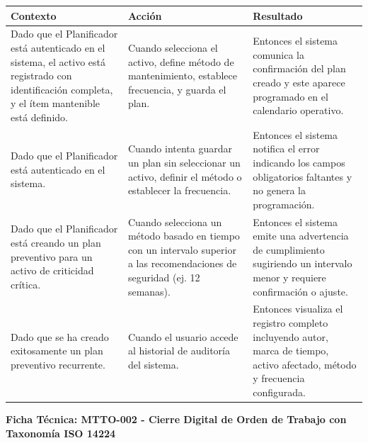 \footnotesize\begin{longtable}{|p{0.28\textwidth}|p{0.32\textwidth}|p{0.34\textwidth}|}\hline
\textbf{Contexto} & \textbf{Acción} & \textbf{Resultado} \\ \hline
\parbox[t]{\linewidth}{Dado que el Planificador está autenticado en el sistema, el activo está registrado con identificación completa, y el ítem mantenible está definido.} & \parbox[t]{\linewidth}{Cuando selecciona el activo, define método de mantenimiento, establece frecuencia, y guarda el plan.} & \parbox[t]{\linewidth}{Entonces el sistema comunica la confirmación del plan creado y este aparece programado en el calendario operativo.} \\ \hline
\parbox[t]{\linewidth}{Dado que el Planificador está autenticado en el sistema.} & \parbox[t]{\linewidth}{Cuando intenta guardar un plan sin seleccionar un activo, definir el método o establecer la frecuencia.} & \parbox[t]{\linewidth}{Entonces el sistema notifica el error indicando los campos obligatorios faltantes y no genera la programación.} \\ \hline
\parbox[t]{\linewidth}{Dado que el Planificador está creando un plan preventivo para un activo de criticidad crítica.} & \parbox[t]{\linewidth}{Cuando selecciona un método basado en tiempo con un intervalo superior a las recomendaciones de seguridad (ej. 12 semanas).} & \parbox[t]{\linewidth}{Entonces el sistema emite una advertencia de cumplimiento sugiriendo un intervalo menor y requiere confirmación o ajuste.} \\ \hline
\parbox[t]{\linewidth}{Dado que se ha creado exitosamente un plan preventivo recurrente.} & \parbox[t]{\linewidth}{Cuando el usuario accede al historial de auditoría del sistema.} & \parbox[t]{\linewidth}{Entonces visualiza el registro completo incluyendo autor, marca de tiempo, activo afectado, método y frecuencia configurada.} \\ \hline
\end{longtable}\normalsize
\vspace{1em}
\noindent\textbf{Ficha Técnica: MTTO-002 - Cierre Digital de Orden de Trabajo con Taxonomía ISO 14224}
\footnotesize\setlength{\tabcolsep}{4pt}\renewcommand{\arraystretch}{1.2}
